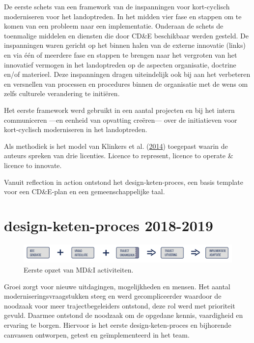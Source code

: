 \documentclass[
]{book}
\begin{document}
De eerste schets van een framework van de inspanningen voor kort-cyclisch moderniseren voor het landoptreden. In het midden vier fase en stappen om te komen van een probleem naar een implementatie. Onderaan de schets de toenmalige middelen en diensten die door CD\&E beschikbaar werden gesteld. De inspanningen waren gericht op het binnen halen van de externe innovatie (links) en via één of meerdere fase en stappen te brengen naar het vergroten van het innovatief vermogen in het landoptreden op de aspecten organisatie, doctrine en/of materieel. Deze inspanningen dragen uiteindelijk ook bij aan het verbeteren en versnellen van processen en procedures binnen de organisatie met de wens om zelfs culturele verandering te initiëren.

Het eerste framework werd gebruikt in een aantal projecten en bij het intern communiceren ---en eenheid van opvatting creëren--- over de initiatieven voor kort-cyclisch moderniseren in het landoptreden.

Als methodiek is het model van Klinkers et al. (\protect\hyperlink{ref-klinkers_navigeren_2014}{2014}) toegepast waarin de auteurs spreken van drie licenties. Licence to represent, licence to operate \& licence to innovate.

Vanuit reflection in action ontstond het design-keten-proces, een basis template voor een CD\&E-plan en een gemeenschappelijke taal.

\hypertarget{design-keten-proces-2018-2019}{%
\section{design-keten-proces 2018-2019}\label{design-keten-proces-2018-2019}}

\begin{figure}

{\centering \includegraphics[width=0.5\linewidth]{data/images/20190710-CDE-designproces_bouwstenenKeten} 

}

\caption{Eerste opzet van MD\&I activiteiten.}\label{fig:unnamed-chunk-17}
\end{figure}

Groei zorgt voor nieuwe uitdagingen, mogelijkheden en mensen. Het aantal moderniseringsvraagstukken steeg en werd gecompliceerder waardoor de noodzaak voor meer trajectbegeleiders ontstond, deze rol werd met prioriteit gevuld. Daarmee ontstond de noodzaak om de opgedane kennis, vaardigheid en ervaring te borgen. Hiervoor is het eerste design-keten-proces en bijhorende canvassen ontworpen, getest en geïmplementeerd in het team.
\end{document}
